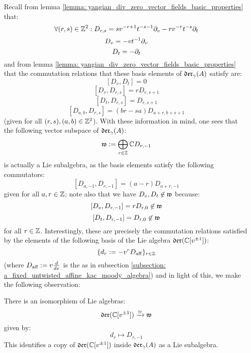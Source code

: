         Recall from lemma \ref{lemma: yangian_div_zero_vector_fields_basic_properties} that:
            $$\forall (r, s) \in \mathbb{Z}^2: D_{r, s} = s v^{-r + 1} t^{-s - 1} \partial_v - r v^{-r} t^{-s} \partial_t$$
            $$D_v = -v t^{-1} \partial_v$$
            $$D_t = -\partial_t$$
        and from lemma \ref{lemma: yangian_div_zero_vector_fields_basic_properties} that the commutation relations that these basis elements of $\mathfrak{der}_{\gamma}(A)$ satisfy are:
            $$[D_v, D_t] = 0$$
            $$[D_v, D_{r, s}] = r D_{r, s + 1}$$
            $$[D_t, D_{r, s}] = D_{r, s + 1}$$
            $$[D_{a, b}, D_{r, s}] = (br - sa) D_{a + r, b + s + 1}$$
        (given for all $(r, s), (a, b) \in \mathbb{Z}^2$). With these information in mind, one sees that the following vector subspace of $\mathfrak{der}_{\gamma}(A)$:
            $$\mathfrak{w} := \bigoplus_{r \in \mathbb{Z}} \mathbb{C} D_{r, -1}$$
        is actually a Lie subalgebra, as the basis elements satisfy the following commutators:
            $$[D_{a, -1}, D_{r, -1}] = (a - r) D_{a + r, -1}$$
        given for all $a, r \in \mathbb{Z}$; note also that we have $D_v, D_t \not \in \mathfrak{w}$ because:
            $$[D_v, D_{r, -1}] = r D_{r, 0} \not \in \mathfrak{w}$$
            $$[D_t, D_{r, -1}] = D_{r, 0} \not \in \mathfrak{w}$$    
        for all $r \in \mathbb{Z}$. Interestingly, these are precisely the commutation relations satisfied by the elements of the following basis of the Lie algebra $\mathfrak{der}(\mathbb{C}[v^{\pm 1}])$:
            $$\{ d_r := -v^r D_{\mathrm{aff}} \}_{r \in \mathbb{Z}}$$
        (where $D_{\mathrm{aff}} := v \frac{d}{dv}$ is the  as in subsection \ref{subsection: a_fixed_untwisted_affine_kac_moody_algebra}) and in light of this, we make the following observation:
        \begin{lemma} \label{lemma: a_copy_of_the_witt_algebra_inside_the_lie_algebra_of_yangian_div_zero_vector_fields}
            There is an isomorphism of Lie algebras:
                $$\mathfrak{der}(\mathbb{C}[v^{\pm 1}]) \xrightarrow[]{\simeq} \mathfrak{w}$$
            given by:
                $$d_r \mapsto D_{r, -1}$$
            This identifies a copy of $\mathfrak{der}(\mathbb{C}[v^{\pm 1}])$ inside $\mathfrak{der}_{\gamma}(A)$ as a Lie subalgebra. 
        \end{lemma}

